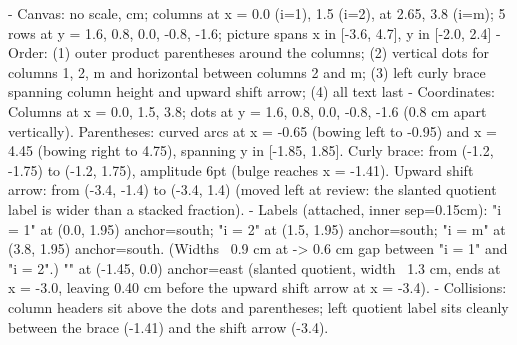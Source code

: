 \begin{proofWrapper}
\begin{content}
\begin{hidden}
- Canvas: no scale, cm; columns at x = 0.0 (i=1), 1.5 (i=2), \cdots at 2.65, 3.8 (i=m); 5 rows at y = 1.6, 0.8, 0.0, -0.8, -1.6; picture spans x in [-3.6, 4.7], y in [-2.0, 2.4]
- Order: (1) outer product parentheses around the columns; (2) vertical dots for columns 1, 2, m and horizontal \cdots between columns 2 and m; (3) left curly brace spanning column height and upward shift arrow; (4) all text last
- Coordinates:
  Columns at x = 0.0, 1.5, 3.8; dots at y = 1.6, 0.8, 0.0, -0.8, -1.6 (0.8 cm apart vertically).
  Parentheses: curved arcs at x = -0.65 (bowing left to -0.95) and x = 4.45 (bowing right to 4.75), spanning y in [-1.85, 1.85].
  Curly brace: from (-1.2, -1.75) to (-1.2, 1.75), amplitude 6pt (bulge reaches x = -1.41).
  Upward shift arrow: from (-3.4, -1.4) to (-3.4, 1.4) (moved left at review: the slanted quotient label is wider than a stacked fraction).
- Labels (attached, inner sep=0.15cm):
  "i = 1" at (0.0, 1.95) anchor=south; "i = 2" at (1.5, 1.95) anchor=south; "i = m" at (3.8, 1.95) anchor=south.
  (Widths ~0.9 cm at \small -> 0.6 cm gap between "i = 1" and "i = 2".)
  "" at (-1.45, 0.0) anchor=east (slanted quotient, width ~1.3 cm, ends at x = -3.0, leaving 0.40 cm before the upward shift arrow at x = -3.4).
- Collisions: column headers sit above the dots and parentheses; left quotient label sits cleanly between the brace (-1.41) and the shift arrow (-3.4).
\end{hidden}
\begin{center}
\end{center}
\end{content}
\end{proofWrapper}
